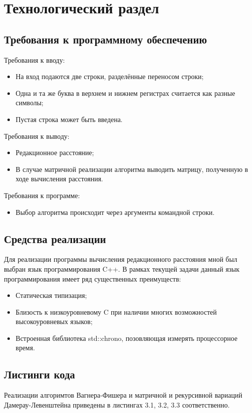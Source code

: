 \chapter{Технологический раздел}
\label{cha:impl}

\section{Требования к программному обеспечению}
Требования к вводу:
\begin{itemize}
    \item На вход подаются две строки, разделённые переносом строки;
    \item Одна и та же буква в верхнем и нижнем регистрах считается как разные символы;
    \item Пустая строка может быть введена.
\end{itemize}
Требования к выводу:
\begin{itemize}
    \item Редакционное расстояние;
    \item В случае матричной реализации алгоритма выводить матрицу, полученную в ходе вычисления расстояния.
\end{itemize}
Требования к программе:
\begin{itemize}
    \item Выбор алгоритма происходит через аргументы командной строки.
\end{itemize}

\section{Средства реализации}
Для реализации программы вычисления редакционного расстояния мной был выбран язык программирования C++. В рамках текущей задачи данный язык программирования имеет ряд существенных преимуществ:
\begin{itemize}
    \item Статическая типизация;
    \item Близость к низкоуровневому C при наличии многих возможностей высокоуровневых языков;
    \item Встроенная библиотека std::chrono, позовляющая измерять процессорное время.
\end{itemize}

\section{Листинги кода}
Реализации алгоримтов Вагнера-Фишера и матричной и рекурсивной вариаций Дамерау-Левенштейна приведены в листингах 3.1, 3.2, 3.3 соответственно.

